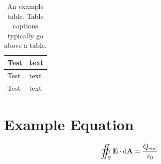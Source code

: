 \documentclass[a4paper, 12pt, english]{article}
\begin{document}
            \begin{table}[!h]
                \centering
                \caption{An example table. Table captions typically go above a table.}
                \label{table: example}
                \begin{tabular}{ |C{0.2\textwidth}|m{0.2\textwidth}| }
                    \hline
                    Test & text\\
                    \hline
                    \hline
                    Test & text\\
                    \hline
                    Test & text\\
                    \hline
                \end{tabular}
            \end{table}

        \section{Example Equation}
            \label{app: example equation}

            \begin{equation}
                \oiint_S \bm{\mathrm{E}} \cdot \dd{\bm{\mathrm{A}}} = \frac{Q_{\text{enc}}}{\varepsilon_0}
                \label{eq: Gauss Law}
            \end{equation}
\end{document}

